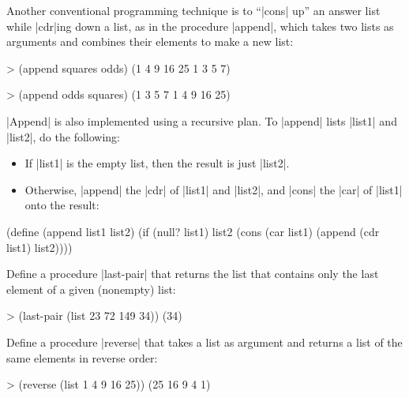 Another conventional programming technique is to ``\scheme|cons| up'' an
answer list while \scheme|cdr|ing down a list, as in the procedure \scheme|append|, which takes two lists as arguments and combines their
elements to make a new list:

\begin{schemedisplay}
> (append squares odds)
(1 4 9 16 25 1 3 5 7)

> (append odds squares)
(1 3 5 7 1 4 9 16 25)
\end{schemedisplay}
\scheme|Append| is also implemented using a recursive plan.  To
\scheme|append| lists \scheme|list1| and \scheme|list2|, do the
following:

\begin{itemize}
\item If \scheme|list1| is the empty list, then the result is just
  \scheme|list2|.

\item Otherwise, \scheme|append| the \scheme|cdr| of \scheme|list1|
  and \scheme|list2|, and \scheme|cons| the \scheme|car| of
  \scheme|list1| onto the result:
\end{itemize}

\begin{schemedisplay}
(define (append list1 list2)
  (if (null? list1)
      list2
      (cons (car list1) (append (cdr list1) list2))))
\end{schemedisplay}

\begin{Exercise}
\label{exc:2.17}
Define a procedure \scheme|last-pair| that returns the list that contains only
the last element of a given (nonempty) list:

\begin{schemedisplay}
> (last-pair (list 23 72 149 34))
(34)
\end{schemedisplay}
\end{Exercise}

\begin{Exercise}
\label{exc:2.18}
Define a procedure \scheme|reverse| that takes a list as argument and
returns a list of the same elements in reverse order:

\begin{schemedisplay}
> (reverse (list 1 4 9 16 25))
(25 16 9 4 1)
\end{schemedisplay}
\end{Exercise}


